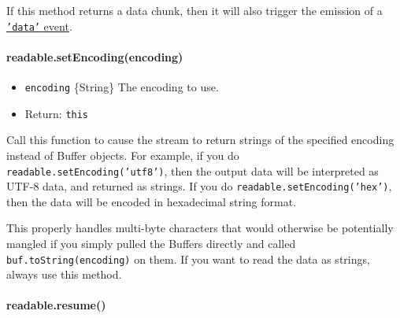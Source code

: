 If this method returns a data chunk, then it will also trigger the
emission of a \hyperref[streamux5feventux5fdata]{\texttt{'data'} event}.

\paragraph{readable.setEncoding(encoding)}\label{readable.setencodingencoding}

\begin{itemize}
\itemsep1pt\parskip0pt
\item
  \texttt{encoding} \{String\} The encoding to use.
\item
  Return: \texttt{this}
\end{itemize}

Call this function to cause the stream to return strings of the
specified encoding instead of Buffer objects. For example, if you do
\texttt{readable.setEncoding('utf8')}, then the output data will be
interpreted as UTF-8 data, and returned as strings. If you do
\texttt{readable.setEncoding('hex')}, then the data will be encoded in
hexadecimal string format.

This properly handles multi-byte characters that would otherwise be
potentially mangled if you simply pulled the Buffers directly and called
\texttt{buf.toString(encoding)} on them. If you want to read the data as
strings, always use this method.

\begin{Shaded}
\end{Shaded}

\paragraph{readable.resume()}\label{readable.resume}

